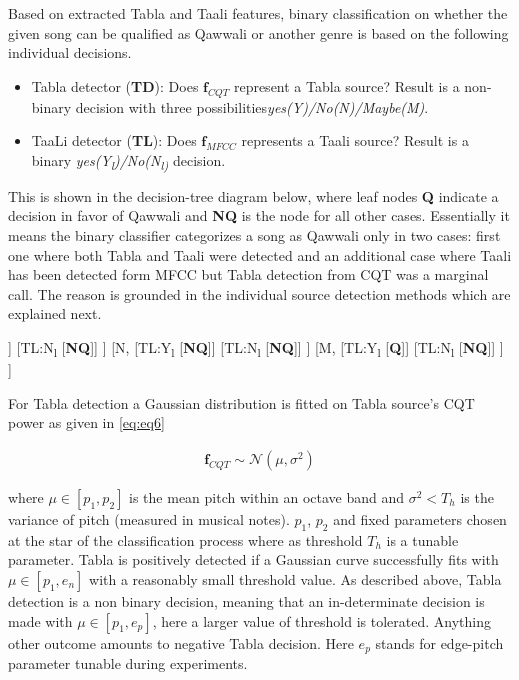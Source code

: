 \documentclass{article}
\begin{document}
Based on extracted Tabla and Taali features, binary classification on whether the given song can be qualified as Qawwali or another genre is based on the following individual decisions.
\begin{itemize}
	\item Tabla detector (\textbf{TD}): Does $\boldsymbol{f}_{CQT}$ represent a Tabla source? Result is a non-binary decision with three possibilities\textit{yes(Y)/No(N)/Maybe(M)}.
	\item TaaLi detector (\textbf{TL}): Does $\boldsymbol{f}_{MFCC}$ represents a Taali source? Result is a binary \textit{yes(Y\textsubscript{l})/No(N\textsubscript{l)}} decision.
\end{itemize}
This is shown in the decision-tree diagram below, where leaf nodes \textbf{Q} indicate a decision in favor of Qawwali and \textbf{NQ} is the node for all other cases. Essentially it means the binary classifier categorizes a song as Qawwali only in two cases: first one where both Tabla and Taali were detected and an additional case where Taali has been detected form MFCC but Tabla detection from CQT was a marginal call. The reason is grounded in the individual source detection methods which are explained next.

\begin{forest}
[TD,
	[Y,
		[TL:Y\textsubscript{l}
			[\textbf{Q}]]
		[TL:N\textsubscript{l}
			[\textbf{NQ}]]
	]
	[N,
		[TL:Y\textsubscript{l}
			[\textbf{NQ}]]
		[TL:N\textsubscript{l}
			[\textbf{NQ}]]
	]
	[M,
		[TL:Y\textsubscript{l}
			[\textbf{Q}]]
		[TL:N\textsubscript{l}
			[\textbf{NQ}]]
	]
]
\end{forest}

For Tabla detection a Gaussian distribution is fitted on Tabla source's CQT power as given in \ref{eq:eq6}

\begin{align}\label{eq:eq8}
\boldsymbol{f}_{CQT} \sim \mathcal{N}(\mu, \sigma^{2})
\end{align}

where $\mu \in [p_{1}, p_{2}]$ is the mean pitch within an octave band and $\sigma^{2} < T_{h}$ is the variance of pitch (measured in musical notes). $p_{1}$, $p_{2}$ and fixed parameters chosen at the star of the classification process where as threshold $T_{h}$ is a tunable parameter. Tabla is positively detected if a Gaussian curve successfully fits with $\mu \in [p_{1}, e_{n}]$ with a reasonably small threshold value. As described above, Tabla detection is a non binary decision, meaning that an in-determinate decision is made with $\mu \in [p_{1}, e_{p}]$, here a larger value of threshold is tolerated. Anything other outcome amounts to negative Tabla decision. Here $e_{p}$ stands for edge-pitch parameter tunable during experiments.  
\end{document}
